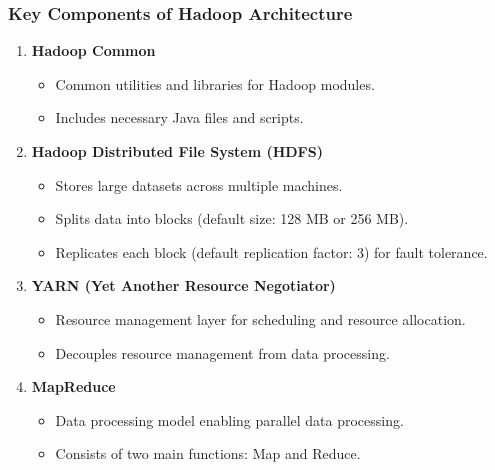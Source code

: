 \documentclass[aspectratio=169]{beamer}
\begin{document}
\begin{frame}[fragile]
    \frametitle{Key Components of Hadoop Architecture}
    \begin{enumerate}
        \item \textbf{Hadoop Common}
        \begin{itemize}
            \item Common utilities and libraries for Hadoop modules.
            \item Includes necessary Java files and scripts.
        \end{itemize}
        
        \item \textbf{Hadoop Distributed File System (HDFS)}
        \begin{itemize}
            \item Stores large datasets across multiple machines.
            \item Splits data into blocks (default size: 128 MB or 256 MB).
            \item Replicates each block (default replication factor: 3) for fault tolerance.
        \end{itemize}
        
        \item \textbf{YARN (Yet Another Resource Negotiator)}
        \begin{itemize}
            \item Resource management layer for scheduling and resource allocation.
            \item Decouples resource management from data processing.
        \end{itemize}
        
        \item \textbf{MapReduce}
        \begin{itemize}
            \item Data processing model enabling parallel data processing.
            \item Consists of two main functions: Map and Reduce.
        \end{itemize}
    \end{enumerate}
\end{frame}
\end{document}
